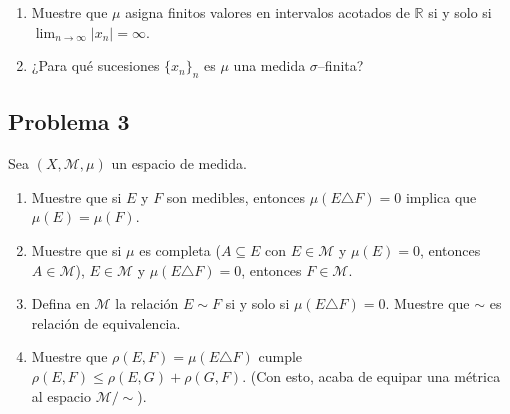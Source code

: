 \documentclass{article}
\theoremstyle{definition}
\theoremstyle{remark}
\numberwithin{equation}{section}
\newcommand{\M}{\mathcal{M}}
\newcommand{\R}{\mathbb{R}}
\newcommand{\oo}{\infty}
\newcommand{\abs}[1]{\left| #1 \right|}
\begin{document}
\begin{enumerate}
\item Muestre que $\mu$ asigna finitos valores en intervalos acotados de $\R$ si y solo si $\lim_{n\to\oo} \abs{x_n} = \oo$.

\item ¿Para qué sucesiones $\{x_n\}_n$ es $\mu$ una medida $\sigma$--finita?
\end{enumerate}

\newpage
\subsection{Problema 3}
Sea $(X,\M,\mu)$ un espacio de medida.
\begin{enumerate}
  \item Muestre que si $E$ y $F$ son medibles, entonces $\mu(E \triangle F) = 0$ implica que $\mu(E) = \mu(F)$.
  \item Muestre que si $\mu$ es completa ($A \subseteq E$ con $E \in \M$ y $\mu(E) = 0$, entonces $A \in \M$), $E \in \M$ y $\mu(E \triangle F) = 0$, entonces $F \in \M$.
  \item Defina en $\M$ la relación $E \sim F$ si y solo si $\mu(E \triangle F) = 0$. Muestre que $\sim$ es relación de equivalencia.
  \item Muestre que $\rho(E,F) = \mu(E \triangle F)$ cumple $\rho(E,F) \leq \rho(E,G) + \rho(G,F)$. (Con esto, acaba de equipar una métrica al espacio $\M/{\sim}$).
\end{enumerate}
\end{document}
